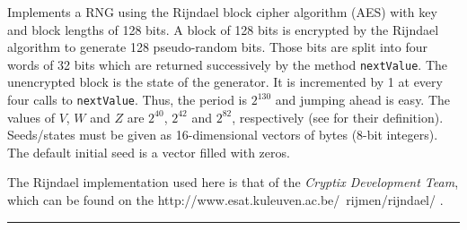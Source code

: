 
Implements a RNG using the Rijndael block cipher algorithm
(AES) with key and block lengths of 128 bits. A block of 128 bits is 
encrypted by the Rijndael algorithm to generate 128 
pseudo-random bits. Those bits are split into four words of 32 bits which are
returned successively by the method \texttt{nextValue}. 
The unencrypted block is the state of the generator. 
It is incremented by 1 at every four calls to \texttt{nextValue}. 
Thus, the period is $2^{130}$ and jumping ahead is easy. 
The values of $V$, $W$ and $Z$ are $2^{40}$, $2^{42}$ and $2^{82}$,
respectively (see  for their definition). 
Seeds/states must be given as 16-dimensional
vectors of bytes (8-bit integers).
The default initial seed is a vector filled with zeros.

The Rijndael implementation used here is that of the 
\emph{Cryptix Development Team}, which can be found on the 
{http://www.esat.kuleuven.ac.be/~rijmen/rijndael/}
.


\bigskip\hrule

